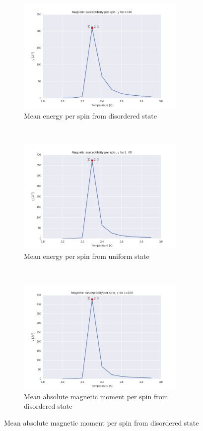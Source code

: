 \documentclass[a4paper, 10pt]{article}
\begin{document}
\begin{figure}[!ht]
    \centering
    \begin{subfigure}[H!]{0.5\textwidth}
        \centering
        \includegraphics[height=2.2in]{chil40Ne5.png}
        \caption{Mean energy per spin from disordered state}
    \end{subfigure}%
    ~ 
    \begin{subfigure}[H!]{0.5\textwidth}
        \centering
        \includegraphics[height=2.2in]{chil60Ne5.png}
        \caption{Mean energy per spin from uniform state}
    \end{subfigure}
        ~
     \begin{subfigure}[H!]{0.5\textwidth}
        \centering
        \includegraphics[height=2.2in]{chil100Ne5.png}
        \caption{Mean absolute magnetic moment per spin from disordered state}
    \end{subfigure}%

\end{figure}
\end{document}
